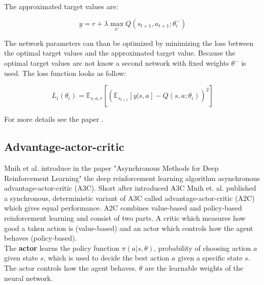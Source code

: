 The approximated target values are:

\begin{equation} \label{eq:1}
y = r + \lambda \max_{a'} Q(s_{t+1}, a_{t+1}; \theta_i^-)
\end{equation}

The network parameters can than be optimized by minimizing the loss between the optimal target values and the approximated target value. Because the optimal target values are not know a second network with fixed weights $\theta^-$ is used. The loss function looks as follow:

\begin{equation} \label{eq:dqn_loss}
L_i(\theta_i) = \mathbb{E}_{s, a, r}[(\mathbb{E}_{s_{t+1}} [ y | s, a] - Q(s, a; \theta_i))^2]
\end{equation}


For more details see the paper \cite{dqn}.\\



\subsection{Advantage-actor-critic}
\label{sec:a2c}

Mnih et al. introduce in the paper "Asynchronous Methods for Deep Reinforcement Learning" \cite{A3C} the deep reinforcement learning algorithm asynchronous advantage-actor-critic (A3C). Short after introduced A3C Mnih et. al. published a synchronous, deterministic variant of A3C called advantage-actor-critic (A2C) which gives equal performance.
A2C combines value-based and policy-based reinforcement learning and consist of two parts. A critic which measures how good a taken action is (value-based) and an actor which controls how the agent behaves (policy-based).\\

The \textbf{actor} learns the policy function $\pi(a | s, \theta)$, probability of choosing action $a$ given state $s$, which is used to decide the best action $a$ given a specific state $s$.
The actor controls how the agent behaves.
$\theta$ are the learnable weights of the neural network. \\

